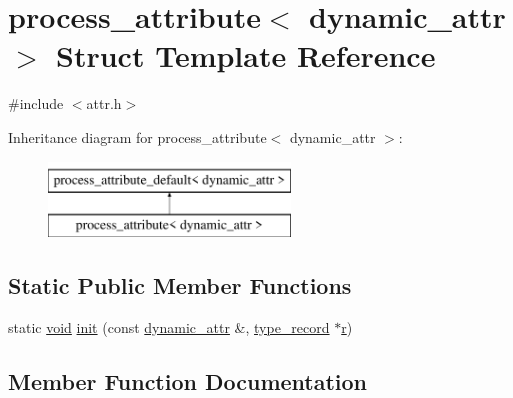 \hypertarget{structprocess__attribute_3_01dynamic__attr_01_4}{}\section{process\+\_\+attribute$<$ dynamic\+\_\+attr $>$ Struct Template Reference}
\label{structprocess__attribute_3_01dynamic__attr_01_4}


{\ttfamily \#include $<$attr.\+h$>$}

Inheritance diagram for process\+\_\+attribute$<$ dynamic\+\_\+attr $>$\+:\begin{figure}[H]
\begin{center}
\leavevmode
\includegraphics[height=2.000000cm]{structprocess__attribute_3_01dynamic__attr_01_4}
\end{center}
\end{figure}
\subsection*{Static Public Member Functions}
\begin{DoxyCompactItemize}
\item 
static \mbox{\hyperlink{_s_d_l__opengles2__gl2ext_8h_ae5d8fa23ad07c48bb609509eae494c95}{void}} \mbox{\hyperlink{structprocess__attribute_3_01dynamic__attr_01_4_ac2081ae3d85243d729c0f1b5f17dfa4e}{init}} (const \mbox{\hyperlink{structdynamic__attr}{dynamic\+\_\+attr}} \&, \mbox{\hyperlink{structtype__record}{type\+\_\+record}} $\ast$\mbox{\hyperlink{_s_d_l__opengl_8h_a42ce7cdc612e53abee15043f80220d97}{r}})
\end{DoxyCompactItemize}


\subsection{Member Function Documentation}
\mbox{\label{structprocess__attribute_3_01dynamic__attr_01_4_ac2081ae3d85243d729c0f1b5f17dfa4e}} 
